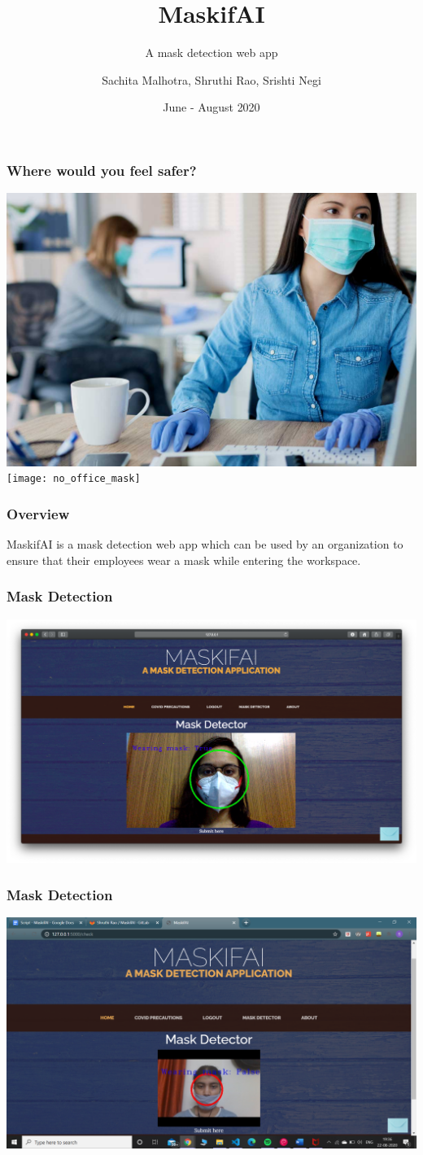 \documentclass[14pt]{beamer}
\title{MaskifAI}
\subtitle{A mask detection web app}
\author[TEAM 6]{Sachita Malhotra, Shruthi Rao, Srishti Negi}
\date{June - August 2020}
\begin{document}
\begin{frame}
    \titlepage
\end{frame}

\begin{frame}
    \frametitle{Where would you feel safer?}
    \centering
    \includegraphics[width=4.5 cm,height=3.5 cm]{office_mask}
    \texttt{[image: no\_office\_mask]}
\end{frame}

\begin{frame}
    \frametitle{Overview}
    MaskifAI is a mask detection web app which can be used by an organization to ensure that their employees wear a mask while entering the workspace.
\end{frame}

\begin{frame}
    \frametitle{Mask Detection}
    \includegraphics[scale=0.2]{mask_true}
\end{frame}

\begin{frame}
    \frametitle{Mask Detection}
    \includegraphics[scale=0.3]{improper_mask}
\end{frame}
\end{document}
